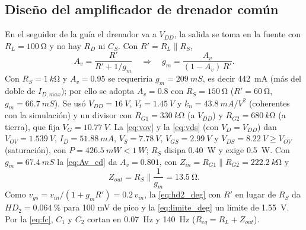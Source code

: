 \documentclass[conference]{IEEEtran}
\newcommand{\gm}{g_m}
\newcommand{\kn}{k_n}
\newcommand{\Vov}{V_{OV}}
\begin{document}
\subsection{Diseño del amplificador de drenador común}
En el seguidor de la guía el drenador va a $V_{DD}$, la salida se toma en la fuente con $R_L=\SI{100}{\ohm}$ y no hay $R_D$ ni $C_S$. Con $R'=R_L\parallel R_S$,
\begin{equation}
A_v=\frac{R'}{R'+1/\gm}\quad\Rightarrow\quad \gm=\frac{A_v}{(1-A_v)\,R'}.
\label{eq:Av_cd}
\end{equation}
Con $R_S=\SI{1}{k\ohm}$ y $A_v=0.95$ se requeriría $\gm=\SI{209}{mS}$, es decir \SI{442}{mA} (más del doble de $I_{D,max}$); por ello se adopta $A_v=0.8$ con $R_S=\SI{150}{\ohm}$ ($R'=\SI{60}{\ohm}$, $\gm=\SI{66.7}{mS}$). Se usó $V_{DD}=\SI{16}{V}$, $V_t=\SI{1.45}{V}$ y $\kn=\SI{43.8}{mA/V^2}$ (coherentes con la simulación) y un divisor con $R_{G1}=\SI{330}{k\ohm}$ (a $V_{DD}$) y $R_{G2}=\SI{680}{k\ohm}$ (a tierra), que fija $V_G=\SI{10.77}{V}$. La \eqref{eq:vov} y la \eqref{eq:vds} (con $V_D=V_{DD}$) dan $\Vov=\SI{1.539}{V}$, $I_D=\SI{51.88}{mA}$, $V_S=\SI{7.78}{V}$, $V_{GS}=\SI{2.99}{V}$ y $V_{DS}=\SI{8.22}{V}\ge\Vov$ (saturación), con $P=\SI{426.5}{mW}<\SI{1}{W}$; $R_S$ disipa \SI{0.40}{W} y exige \SI{0.5}{W}. Con $\gm=\SI{67.4}{mS}$ la \eqref{eq:Av_cd} da $A_v=0.801$, con $Z_{in}=R_{G1}\parallel R_{G2}=\SI{222.2}{k\ohm}$ y
\begin{equation}
Z_{out}=R_S\parallel\frac{1}{\gm}=\SI{13.5}{\ohm}.
\label{eq:zout_cd}
\end{equation}
Como $v_{gs}=v_{in}/(1+\gm R')=0.2\,v_{in}$, la \eqref{eq:hd2_deg} con $R'$ en lugar de $R_S$ da $HD_2=\SI{0.064}{\percent}$ para 100 mV de pico y la \eqref{eq:limite_deg} un límite de \SI{1.55}{V}. Por la \eqref{eq:fc}, $C_1$ y $C_2$ cortan en \SI{0.07}{Hz} y \SI{140}{Hz} ($R_{eq}=R_L+Z_{out}$).
\end{document}
